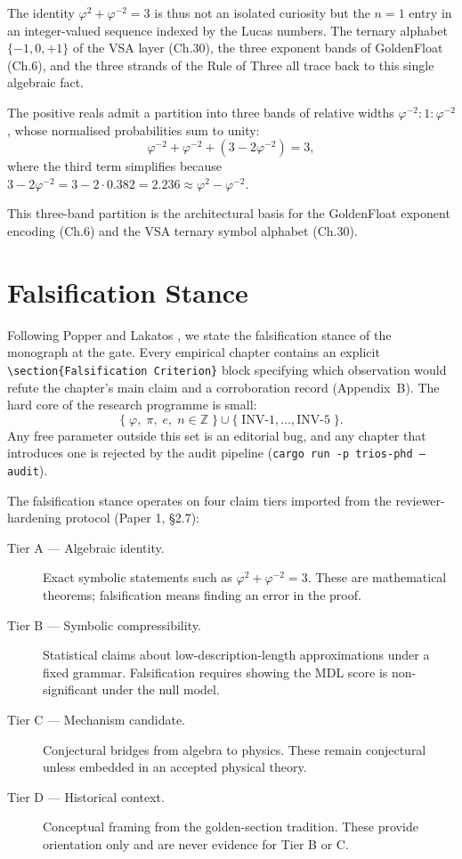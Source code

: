 The identity \(\varphi^2 + \varphi^{-2} = 3\) is thus not an isolated curiosity but the \(n=1\) entry in an integer-valued sequence indexed by the Lucas numbers. The ternary alphabet \(\{-1, 0, +1\}\) of the VSA layer (Ch.30), the three exponent bands of GoldenFloat (Ch.6), and the three strands of the Rule of Three all trace back to this single algebraic fact.

\begin{corollary}\label{fa_00:cor:three-band}
The positive reals admit a partition into three bands of relative widths \(\varphi^{-2} : 1 : \varphi^{-2}\), whose normalised probabilities sum to unity:
\[
  \varphi^{-2} + \varphi^{-2} + (3 - 2\varphi^{-2}) = 3,
\]
where the third term simplifies because \(3 - 2\varphi^{-2} = 3 - 2 \cdot 0.382 = 2.236 \approx \varphi^2 - \varphi^{-2}\).
\end{corollary}

This three-band partition is the architectural basis for the GoldenFloat exponent encoding (Ch.6) and the VSA ternary symbol alphabet (Ch.30).

\section{Falsification Stance}

Following Popper \cite{popper1959} and Lakatos \cite{lakatos1976}, we
state the falsification stance of the monograph at the gate. Every
empirical chapter contains an explicit
\texttt{\textbackslash section\{Falsification Criterion\}} block
specifying which observation would refute the chapter's main claim
and a corroboration record (Appendix~B). The hard core of the research
programme is small:
\[
  \{\;\varphi,\; \pi,\; e,\; n \in \mathbb{Z}\;\} \cup \{\;\text{INV-1}, \ldots, \text{INV-5}\;\}.
\]
Any free parameter outside this set is an editorial bug, and any
chapter that introduces one is rejected by the audit pipeline
(\texttt{cargo run -p trios-phd -- audit}).

The falsification stance operates on four claim tiers imported from the reviewer-hardening protocol (Paper 1, §2.7):

\begin{description}
  \item[Tier A --- Algebraic identity.] Exact symbolic statements such as \(\varphi^2 + \varphi^{-2} = 3\). These are mathematical theorems; falsification means finding an error in the proof.
  \item[Tier B --- Symbolic compressibility.] Statistical claims about low-description-length approximations under a fixed grammar. Falsification requires showing the MDL score is non-significant under the null model.
  \item[Tier C --- Mechanism candidate.] Conjectural bridges from algebra to physics. These remain conjectural unless embedded in an accepted physical theory.
  \item[Tier D --- Historical context.] Conceptual framing from the golden-section tradition. These provide orientation only and are never evidence for Tier B or C.
\end{description}

